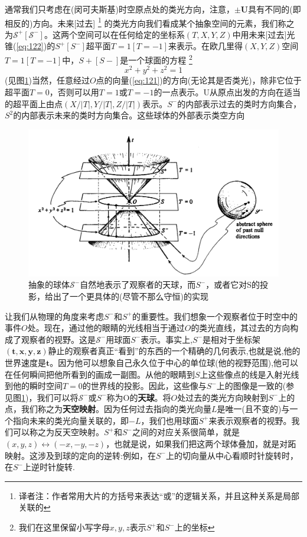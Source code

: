 \documentclass[utf8]{ctexbook}
\numberwithin{equation}{section}
\begin{document}
通常我们只考虑在(闵可夫斯基)时空原点处的类光方向，注意，$\pm \mathbf{U}$具有不同的(即相反的)方向。未来[过去]
\footnote{译者注：作者常用大片的方括号来表达“或”的逻辑关系，并且这种关系是局部关联的}
的类光方向我们看成某个抽象空间的元素，我们称之为$\mathscr{S}^+[\mathscr{S}^-]$。这两个空间可以在任何给定的坐标系$(T, X, Y, Z)$中用未来[过去]光锥(\ref{eq:122})的$S^+[S^-]$超平面$T=1[T=-1]$来表示。在欧几里得$(X, Y, Z)$空间$T=1 [T=-1]$中，$S+ [S-]$是一个球面的方程
\footnote{我们在这里保留小写字母$x, y, z$表示$S^+$和$S^-$上的坐标}
\begin{equation}
    x^2 + y^2 + z^2 = 1\label{eq:123}
\end{equation}
(见图\ref{fig:1-2})当然，任意经过$O$点的向量(\ref{eq:121})的方向(无论其是否类光)，除非它位于超平面$T= 0$，否则可以用$T= 1$或$T=-1$的一点表示。U从原点出发的方向在适当的超平面上由点$(X/\left\lvert T\right\rvert , Y/\left\lvert T\right\rvert , Z/\left\lvert T\right\rvert )$表示。$S^-$的内部表示过去的类时方向集合，$S^2$的内部表示未来的类时方向集合。这些球体的外部表示类空方向
\begin{figure}
    \centering
    \includegraphics[width=12cm]{fig1-2.png}
    \caption{抽象的球体$\mathscr{S}^-$自然地表示了观察者的天球，而$S^-$，或者它对S的投影，给出了一个更具体的(尽管不那么守恒)的实现}\label{fig:1-2}
\end{figure}

让我们从物理的角度来考虑$S^-$和$S^+$的重要性。我们想象一个观察者位于时空中的事件$O$处。现在，通过他的眼睛的光线相当于通过$O$的类光直线，其过去的方向构成了观察者的视野。这是$\mathscr{S}^-$用球面$S^-$表示。事实上,$S^-$是相对于坐标架$(\mathbf{t,x,y,z})$静止的观察者真正“看到”的东西的一个精确的几何表示,也就是说,他的世界速度是$\mathbf{t}$。因为他可以想象自己永久位于中心的单位球(他的视野范围),他可以在任何瞬间把他所看到的画成一副图。从他的眼睛到$S$上这些像点的线是入射光线到他的瞬时空间$T=0$的世界线的投影。因此，这些像与$S^-$上的图像是一致的(参见图\ref{fig:1-2})，我们可以将$\mathscr{S}^-$或$S^-$称为O的\textbf{天球}。将$O$处过去的类光方向映射到$S^-$上的点，我们称之为\textbf{天空映射}。因为任何过去指向的类光向量$L$是唯一(且不变的)与一个指向未来的类光向量关联的，即$-L$，我们也用球面$S^+$来表示观察者的视野。我们可以称之为反天空映射。$S^+$和$S^-$之间的对应关系很简单，就是$(x,y,z)\leftrightarrow (-x,-y,-z)$，也就是说，如果我们把这两个球体叠加，就是对跖映射。这涉及到球的定向的逆转:例如，在$S^-$上的切向量从中心看顺时针旋转时，在$S^-$上逆时针旋转.
\end{document}
